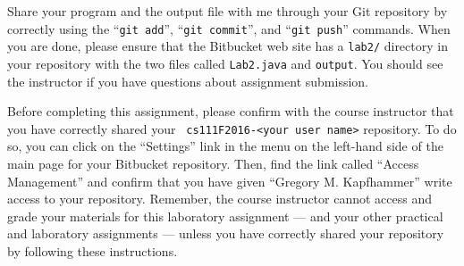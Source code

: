 Share your program and the output file with me through your Git repository by correctly using the ``{\tt git add}'',
``{\tt git commit}'', and ``{\tt git push}'' commands. When you are done, please ensure that the Bitbucket web site has
a {\tt lab2/} directory in your repository with the two files called {\tt Lab2.java} and {\tt output}. You should see
the instructor if you have questions about assignment submission.

Before completing this assignment, please confirm with the course instructor that you have correctly shared your {\tt
cs111F2016-<your user name>} repository. To do so, you can click on the ``Settings'' link in the menu on the left-hand
side of the main page for your Bitbucket repository. Then, find the link called ``Access Management'' and confirm that
you have given ``Gregory M. Kapfhammer'' write access to your repository. Remember, the course instructor cannot access
and grade your materials for this laboratory assignment --- and your other practical and laboratory assignments ---
unless you have correctly shared your repository by following these instructions.


